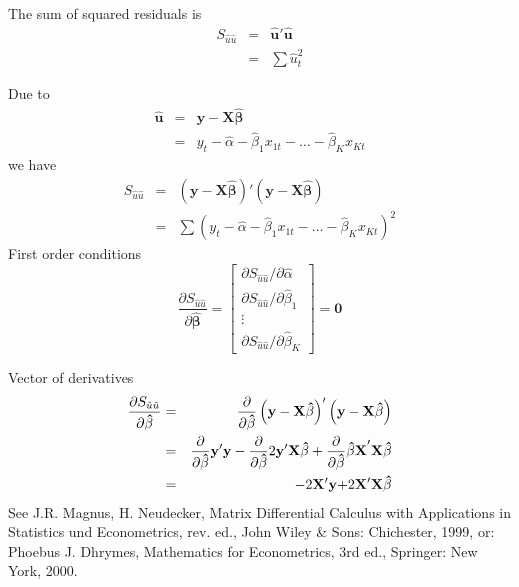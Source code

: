 \documentclass{article}
\begin{document}
The sum of squared residuals is
\begin{eqnarray*}
S_{\hat{u}\hat{u}} &=&\mathbf{\hat{u}}'\mathbf{\hat{u}} \\
&=&\sum \hat{u}_{t}^{2}
\end{eqnarray*}

Due to
\begin{eqnarray*}
\mathbf{\hat{u}} &=&\mathbf{y}-\mathbf{X\hat{\beta}} \\
&=&y_{t}-\hat{\alpha}-\hat{\beta}_{1}x_{1t}-\ldots -\hat{\beta}_{K}x_{Kt}
\end{eqnarray*}
we have
\begin{eqnarray*}
S_{\hat{u}\hat{u}} &=&\left( \mathbf{y}-\mathbf{X\hat{\beta}}\right)'\left( \mathbf{y}-\mathbf{X\hat{\beta}}\right) \\
&=&\sum \left( y_{t}-\hat{\alpha}-\hat{\beta}_1 x_{1t}-\ldots -\hat{\beta}_{K}x_{Kt}\right)^2
\end{eqnarray*}
First order conditions
\begin{equation*}
\frac{\partial S_{\hat{u}\hat{u}}}{\partial \mathbf{\hat{\beta}}}=\left[ 
\begin{array}{l}
\partial S_{\hat{u}\hat{u}}/\partial \hat{\alpha} \\ 
\partial S_{\hat{u}\hat{u}}/\partial \hat{\beta}_{1} \\ 
\vdots \\ 
\partial S_{\hat{u}\hat{u}}/\partial \hat{\beta}_{K}
\end{array}
\right] =\mathbf{0}
\end{equation*}

Vector of derivatives
\begin{eqnarray*}
\frac{\partial S_{\hat{u}\hat{u}}}{\partial \mathbf{\hat{\beta}}} &=&\frac{%
\partial }{\partial \mathbf{\hat{\beta}}}\left( \mathbf{y}-\mathbf{X\hat{%
\beta}}\right) '\left( \mathbf{y}-\mathbf{X\hat{\beta}}\right) \\
&=&\frac{\partial }{\partial \mathbf{\hat{\beta}}}\mathbf{y}'%
\mathbf{y}-\frac{\partial }{\partial \mathbf{\hat{\beta}}}2\mathbf{y}%
'\mathbf{X\hat{\beta}}+\frac{\partial }{\partial \mathbf{\hat{\beta}%
}}\mathbf{\hat{\beta}X}'\mathbf{X\hat{\beta}} \\
&=&-2\mathbf{X}'\mathbf{y+}2\mathbf{X}'\mathbf{X\hat{\beta}}
\end{eqnarray*}
See J.R. Magnus, H. Neudecker, Matrix Differential Calculus with
Applications in Statistics und Econometrics, rev. ed., John Wiley \& Sons:
Chichester, 1999, or: Phoebus J. Dhrymes, Mathematics for Econometrics, 3rd ed.,
Springer: New York, 2000.
\end{document}
